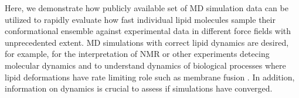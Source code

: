 \documentclass[journal=jpcbfk,manuscript=article,layout=twocolumn]{achemso}
\begin{document}
Here, we demonstrate how publicly available set of MD simulation data can be utilized to
rapidly evaluate how fast individual lipid molecules sample their conformational ensemble
against experimental data in different force fields with unprecedented extent. 
MD simulations with correct lipid dynamics are desired, for example, for the interpretation of
NMR or other experiments detecing molecular dynamics and to understand dynamics of biological processes where
lipid deformations have rate limiting role such as membrane fusion \cite{??}.
In addition, 
information on dynamics is crucial to assess if simulations have converged.%
%

\end{document}
